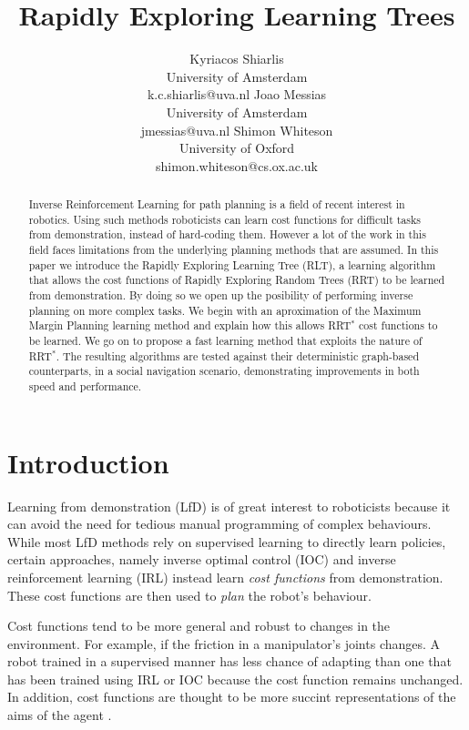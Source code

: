 \documentclass{article}  %
\title{\LARGE \bf
Rapidly Exploring Learning Trees
}
\author{Kyriacos Shiarlis \\
University of Amsterdam \\
k.c.shiarlis@uva.nl
\And 
Joao Messias \\
University of Amsterdam \\ 
jmessias@uva.nl 
\And
Shimon Whiteson \\
University of Oxford \\
shimon.whiteson@cs.ox.ac.uk 
}
\begin{document}
\maketitle
\thispagestyle{empty}
\pagestyle{empty}


\begin{abstract}
Inverse Reinforcement Learning for path planning is a field of recent interest in robotics. Using such methods roboticists can learn cost functions for difficult tasks from demonstration, instead of hard-coding them. However a lot of the work in this field faces limitations from the underlying planning methods that are assumed. In this paper we introduce the Rapidly Exploring Learning Tree (RLT), a learning algorithm that allows the cost functions of Rapidly Exploring Random Trees (RRT) to be learned from demonstration. By doing so we open up the posibility of performing inverse planning on more complex tasks. We begin with an aproximation of the Maximum Margin Planning learning method and explain how this allows RRT$^*$ cost functions to be learned. We go on to propose a fast learning method that exploits the nature of RRT$^*$. The resulting algorithms are tested against their deterministic graph-based counterparts, in a social navigation scenario, demonstrating improvements in both speed and performance.


\end{abstract}


\section{Introduction}

Learning from demonstration (LfD) \cite{argall2009survey} is of great interest to roboticists because it can avoid the need for tedious manual programming of complex behaviours. While most LfD methods rely on supervised learning to directly learn policies, certain approaches, namely inverse optimal control (IOC) \cite{kalman1964linear} and inverse reinforcement learning (IRL) \cite{abbeel2004apprenticeship} instead learn \emph{cost functions} from demonstration. These cost functions are then used to \emph{plan} the robot's behaviour. 

Cost functions tend to be more general and robust to changes in the environment. For example, if the friction in a manipulator's joints changes. A robot trained in a supervised manner has less chance of adapting than one that has been trained using IRL or IOC because the cost function remains unchanged. In addition, cost functions are thought to be more succint representations of the aims of the agent \cite{abbeel2004apprenticeship}. %
\end{document}
